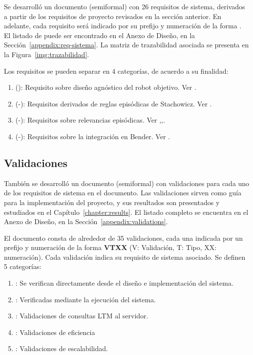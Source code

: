 Se desarrolló un documento (semiformal) con 26 requisitos de sistema, derivados a partir de los requisitos de proyecto revisados en la sección anterior. En adelante, cada requisito será indicado por su prefijo y numeración de la forma . El listado de puede ser encontrado en el Anexo de Diseño, en la Sección~\ref{appendix:req-sistema}. La matriz de trazabilidad asociada se presenta en la Figura~\ref{img:trazabilidad}.

Los requisitos se pueden separar en 4 categorías, de acuerdo a su finalidad:
\begin{enumerate}
\item (): Requisito sobre diseño agnóstico del robot objetivo. Ver .
\item (-): Requisitos derivados de reglas episódicas de Stachowicz. Ver .
\item (-): Requisitos sobre relevancias episódicas. Ver ,,.
\item (-): Requisitos sobre la integración en Bender. Ver .
\end{enumerate}

\subsection{Validaciones}

También se desarrolló un documento (semiformal) con validaciones para cada uno de los requisitos de sistema en el documento. Las validaciones sirven como guía para la implementación del proyecto, y sus resultados son presentados y estudiados en el Capítulo~\ref{chapter:results}. El listado completo se encuentra en el Anexo de Diseño, en la Sección~\ref{appendix:validations}.

El documento consta de alrededor de 35 validaciones, cada una indicada por un prefijo y numeración de la forma {\bfseries VTXX} (V: Validación, T: Tipo, XX: numeración). Cada validación indica su requisito de sistema asociado. Se definen 5 categorías: 
\begin{enumerate}
	\item {}: Se verifican directamente desde el diseño e implementación del sistema.
	\item {}: Verificadas mediante la ejecución del sistema.
	\item {}: Validaciones de consultas LTM al servidor.
	\item {}: Validaciones de eficiencia
	\item {}: Validaciones de escalabilidad.
\end{enumerate}

